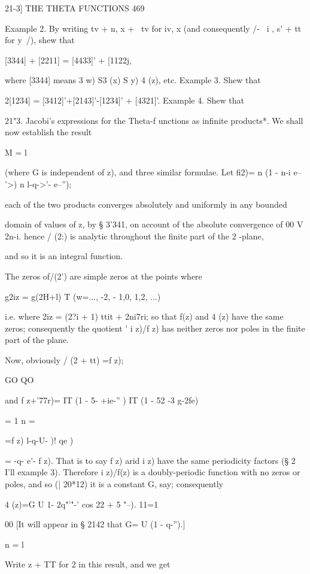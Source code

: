 21-3] THE THETA FUNCTIONS 469

Example 2. By writing tv + n, x + \ tv for iv, x (and consequently /-
\ i , s' + tt for y\ /), shew that

[3344] + [2211] = [4433]' + [1122j,

where [3344] means 3 w) S3 (x) S y) 4 (z), etc. Example 3. Shew that

2[1234] = [3412]'+[2143]'-[1234]' + [4321]'. Example 4. Shew that

21"3. Jacobi's expressions for the Theta-f unctions as infinite
products*. We shall now establish the result

M = l

(where G is independent of z), and three similar formulae. Let fi2)= n
(1 - n-i e-- '>) n l-q->'- e--'');

each of the two products converges absolutely and uniformly in any
bounded

domain of values of z, by § 3'341, on account of the absolute
convergence of 00 V 2n-i. hence / (2:) is analytic throughout the
finite part of the 2 -plane,

and so it is an integral function.

The zeros of/(2') are simple zeros at the points where

g2iz = g(2H+l) T (w=..., -2, - 1,0, 1,2, ...)

i.e. where 2iz = (2?i + 1) ttit + 2ni7ri; so that f(z) and 4 (z) have
the same zeros; consequently the quotient ' i z)/f z) has neither
zeros nor poles in the finite part of the plane.

Now, obviously / (2 + tt) =f z);

GO QO

and f z+'77r)= IT (1 - 5- +ie-'' ) IT (1 - 52 -3 g-2fe)

  = 1 n = \

=f z) l-q-U- )! qe )

= -q- e'- f z). That is to say f z) arid i z) have the same
periodicity factors (§ 2 I'll example 3). Therefore i z)/f(z) is a
doubly-periodic function with no zeros or poles, and so (| 20*12) it
is a constant G, say; consequently

 4 (z)=G U 1- 2q"'"-' cos 22 + 5 "--). 11=1

00 [It will appear in § 2142 that G= U (1 - q-'').]

n = l

Write z + TT for 2 in this result, and we get



